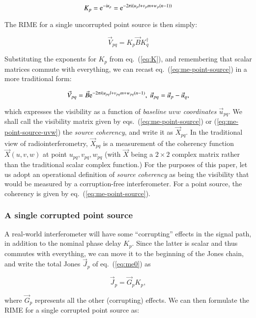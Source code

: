 \documentclass[]{aa}
\begin{document}
  \begin{equation}\label{eq:K}
  K_p = {\rm e}^{-i\kappa_p} = {\rm e}^{-2\pi i(u_p l+v_p m+w_p (n-1))}
  \end{equation}

The RIME for a single uncorrupted point source is then simply:

  \begin{equation}\label{eq:me-point-source}
  \vec V_{pq} = K_p \vec B  K^\dagger_q
  \end{equation}

Substituting the exponents for $K_p$ from eq.~(\ref{eq:K}), and remembering that scalar matrices commute with everything, we can recast eq.~(\ref{eq:me-point-source}) in a more traditional form:

  \begin{equation}\label{eq:me-point-source-uvw}
  \vec V_{pq} = \vec B  {\rm e}^{-2\pi i(u_{pq} l+v_{pq} m+w_{pq} (n-1)},\;\vec u_{pq} = \vec u_p - \vec u_q,
  \end{equation}
 
which expresses the visibility as a function of {\em baseline $uvw$ coordinates} $\vec u_{pq}$. We shall call the visibility matrix given by eqs.~(\ref{eq:me-point-source}) or (\ref{eq:me-point-source-uvw}) the {\em source coherency}, and write it as $\vec X_{pq}$. In the traditional view of radiointerferometry, $\vec X_{pq}$ is a measurement of the coherency function $\vec X(u,v,w)$ at point $u_{pq},v_{pq},w_{pq}$ (with $\vec X$ being a $2\times2$ complex matrix rather than the traditional scalar complex function.) For the purposes of this paper, let us adopt an operational definition of {\em source coherency} as being the visibility that would be measured by a corruption-free interferometer. For a point source, the coherency is given by eq.~(\ref{eq:me-point-source}).

\subsubsection{A single corrupted point source}

A real-world interferometer will have some ``corrupting'' effects in the signal path, in addition to the nominal phase delay $K_p$. Since the latter is scalar and thus commutes with everything, we can move it to the beginning of the Jones chain, and write the total Jones $\vec J_p$ of eq.~(\ref{eq:me0}) as

\[
\vec J_p = \vec G_p K_p,
\]

where $\vec G_p$ represents all the other (corrupting) effects. We can then formulate the RIME for a single corrupted point source as:
\end{document}
